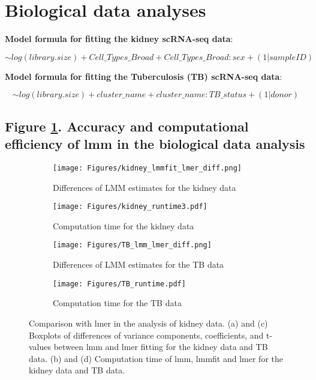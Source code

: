 \documentclass[
]{article}
\begin{document}
\hypertarget{biological-data-analyses}{%
\section{Biological data analyses}\label{biological-data-analyses}}

\textbf{Model formula for fitting the kidney scRNA-seq data}:

\[
\sim log(library.size) + Cell\_Types\_Broad + Cell\_Types\_Broad:sex + (1 | sampleID)
\]

\textbf{Model formula for fitting the Tuberculosis (TB) scRNA-seq data}:

\[\sim log(library.size) + cluster\_name + cluster\_name:TB\_status + (1 | donor)\]

\hypertarget{figure-.-accuracy-and-computational-efficiency-of-lmm-in-the-biological-data-analysis}{%
\subsection{\texorpdfstring{Figure \ref{fig:realdata_lmm}. Accuracy and
computational efficiency of lmm in the biological data
analysis}{Figure . Accuracy and computational efficiency of lmm in the biological data analysis}}\label{figure-.-accuracy-and-computational-efficiency-of-lmm-in-the-biological-data-analysis}}

\begin{figure}[htb]
     \centering
     \begin{subfigure}[b]{0.45\textwidth}
         \centering
         \texttt{[image: Figures/kidney\_lmmfit\_lmer\_diff.png]}
         \caption{Differences of LMM estimates for the kidney data}
     \end{subfigure}
     \begin{subfigure}[b]{0.45\textwidth}
         \centering
         \texttt{[image: Figures/kidney\_runtime3.pdf]}
         \caption{Computation time for the kidney data}
     \end{subfigure} 
     \begin{subfigure}[b]{0.45\textwidth}
         \centering
         \texttt{[image: Figures/TB\_lmm\_lmer\_diff.png]}
         \caption{Differences of LMM estimates for the TB data}
     \end{subfigure}
     \begin{subfigure}[b]{0.45\textwidth}
         \centering
         \texttt{[image: Figures/TB\_runtime.pdf]}
         \caption{Computation time for the TB data}
     \end{subfigure}
     \centering
     \caption{Comparison with lmer in the analysis of kidney data. (a) and (c) Boxplots of differences of variance components, coefficients, and t-values between lmm and lmer fitting for the kidney data and TB data. (b) and (d) Computation time of lmm, lmmfit and lmer for the kidney data and TB data.}
     \label{fig:realdata_lmm}
\end{figure}
\end{document}
